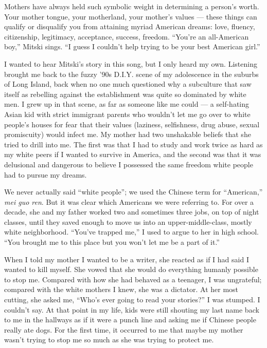 Mothers have always held such symbolic weight in determining a person's
worth. Your mother tongue, your motherland, your mother's values ---
these things can qualify or disqualify you from attaining myriad
American dreams: love, fluency, citizenship, legitimacy, acceptance,
success, freedom. ``You're an all-American boy,'' Mitski sings. ``I
guess I couldn't help trying to be your best American girl.''

I wanted to hear Mitski's story in this song, but I only heard my own.
Listening brought me back to the fuzzy '90s D.I.Y. scene of my
adolescence in the suburbs of Long Island, back when no one much
questioned why a subculture that saw itself as rebelling against the
establishment was quite so dominated by white men. I grew up in that
scene, as far as someone like me could --- a self-hating Asian kid with
strict immigrant parents who wouldn't let me go over to white people's
houses for fear that their values (laziness, selfishness, drug abuse,
sexual promiscuity) would infect me. My mother had two unshakable
beliefs that she tried to drill into me. The first was that I had to
study and work twice as hard as my white peers if I wanted to survive in
America, and the second was that it was delusional and dangerous to
believe I possessed the same freedom white people had to pursue my
dreams.

We never actually said ``white people''; we used the Chinese term for
``American,'' \emph{mei guo ren}. But it was clear which Americans we
were referring to. For over a decade, she and my father worked two and
sometimes three jobs, on top of night classes, until they saved enough
to move us into an upper-middle-class, mostly white neighborhood.
``You've trapped me,'' I used to argue to her in high school. ``You
brought me to this place but you won't let me be a part of it.''

When I told my mother I wanted to be a writer, she reacted as if I had
said I wanted to kill myself. She vowed that she would do everything
humanly possible to stop me. Compared with how she had behaved as a
teenager, I was ungrateful; compared with the white mothers I knew, she
was a dictator. At her most cutting, she asked me, ``Who's ever going to
read your stories?'' I was stumped. I couldn't say. At that point in my
life, kids were still shouting my last name back to me in the hallways
as if it were a punch line and asking me if Chinese people really ate
dogs. For the first time, it occurred to me that maybe my mother wasn't
trying to stop me so much as she was trying to protect me.

